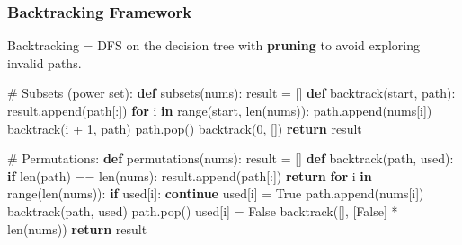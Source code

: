 \documentclass[11pt]{article}
\newenvironment{Shaded}{\begin{snugshade}}{\end{snugshade}}
\newcommand{\BuiltInTok}[1]{\textcolor[rgb]{0.50,0.55,0.55}{#1}}
\newcommand{\CommentTok}[1]{\textcolor[rgb]{0.48,0.49,0.49}{#1}}
\newcommand{\ControlFlowTok}[1]{\textcolor[rgb]{0.99,0.74,0.29}{\textbf{#1}}}
\newcommand{\DecValTok}[1]{\textcolor[rgb]{0.96,0.45,0.00}{#1}}
\newcommand{\KeywordTok}[1]{\textcolor[rgb]{0.81,0.81,0.76}{\textbf{#1}}}
\newcommand{\NormalTok}[1]{\textcolor[rgb]{0.81,0.81,0.76}{#1}}
\newcommand{\OperatorTok}[1]{\textcolor[rgb]{0.81,0.81,0.76}{#1}}
\newcommand{\VariableTok}[1]{\textcolor[rgb]{0.15,0.68,0.68}{#1}}
\begin{document}
\subsubsection{Backtracking Framework}\label{backtracking-framework}

Backtracking = DFS on the decision tree with \textbf{pruning} to avoid exploring invalid paths.


\begin{Shaded}
\begin{Highlighting}[]
\CommentTok{\# Subsets (power set):}
\KeywordTok{def}\NormalTok{ subsets(nums):}
\NormalTok{    result }\OperatorTok{=}\NormalTok{ []}
    \KeywordTok{def}\NormalTok{ backtrack(start, path):}
\NormalTok{        result.append(path[:])}
        \ControlFlowTok{for}\NormalTok{ i }\KeywordTok{in} \BuiltInTok{range}\NormalTok{(start, }\BuiltInTok{len}\NormalTok{(nums)):}
\NormalTok{            path.append(nums[i])}
\NormalTok{            backtrack(i }\OperatorTok{+} \DecValTok{1}\NormalTok{, path)}
\NormalTok{            path.pop()}
\NormalTok{    backtrack(}\DecValTok{0}\NormalTok{, [])}
    \ControlFlowTok{return}\NormalTok{ result}

\CommentTok{\# Permutations:}
\KeywordTok{def}\NormalTok{ permutations(nums):}
\NormalTok{    result }\OperatorTok{=}\NormalTok{ []}
    \KeywordTok{def}\NormalTok{ backtrack(path, used):}
        \ControlFlowTok{if} \BuiltInTok{len}\NormalTok{(path) }\OperatorTok{==} \BuiltInTok{len}\NormalTok{(nums):}
\NormalTok{            result.append(path[:])}
            \ControlFlowTok{return}
        \ControlFlowTok{for}\NormalTok{ i }\KeywordTok{in} \BuiltInTok{range}\NormalTok{(}\BuiltInTok{len}\NormalTok{(nums)):}
            \ControlFlowTok{if}\NormalTok{ used[i]: }\ControlFlowTok{continue}
\NormalTok{            used[i] }\OperatorTok{=} \VariableTok{True}
\NormalTok{            path.append(nums[i])}
\NormalTok{            backtrack(path, used)}
\NormalTok{            path.pop()}
\NormalTok{            used[i] }\OperatorTok{=} \VariableTok{False}
\NormalTok{    backtrack([], [}\VariableTok{False}\NormalTok{] }\OperatorTok{*} \BuiltInTok{len}\NormalTok{(nums))}
    \ControlFlowTok{return}\NormalTok{ result}


\end{Highlighting}
\end{Shaded}
\end{document}
